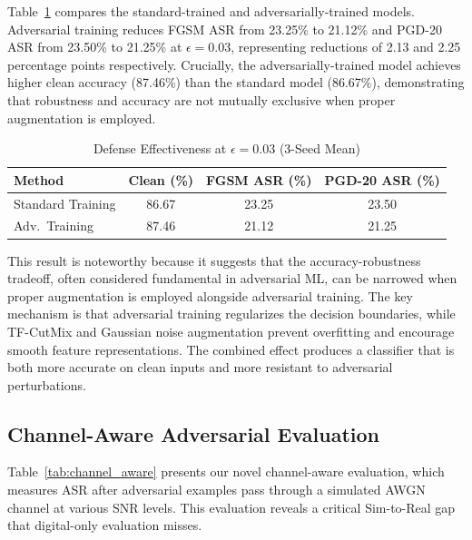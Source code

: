 \documentclass[conference]{IEEEtran}
\begin{document}
Table~\ref{tab:defense} compares the standard-trained and adversarially-trained models. Adversarial training reduces FGSM ASR from 23.25\% to 21.12\% and PGD-20 ASR from 23.50\% to 21.25\% at $\epsilon = 0.03$, representing reductions of 2.13 and 2.25 percentage points respectively. Crucially, the adversarially-trained model achieves higher clean accuracy (87.46\%) than the standard model (86.67\%), demonstrating that robustness and accuracy are not mutually exclusive when proper augmentation is employed.

\begin{table}[t]
\centering
\caption{Defense Effectiveness at $\epsilon=0.03$ (3-Seed Mean)}\label{tab:defense}
\begin{tabular}{lccc}
\toprule
\textbf{Method} & \textbf{Clean (\%)} & \textbf{FGSM ASR (\%)} & \textbf{PGD-20 ASR (\%)} \\
\midrule
Standard Training & 86.67 & 23.25 & 23.50 \\
Adv.\ Training & 87.46 & 21.12 & 21.25 \\
\bottomrule
\end{tabular}
\end{table}

This result is noteworthy because it suggests that the accuracy-robustness tradeoff, often considered fundamental in adversarial ML, can be narrowed when proper augmentation is employed alongside adversarial training. The key mechanism is that adversarial training regularizes the decision boundaries, while TF-CutMix and Gaussian noise augmentation prevent overfitting and encourage smooth feature representations. The combined effect produces a classifier that is both more accurate on clean inputs and more resistant to adversarial perturbations.

\subsection{Channel-Aware Adversarial Evaluation}

Table~\ref{tab:channel_aware} presents our novel channel-aware evaluation, which measures ASR after adversarial examples pass through a simulated AWGN channel at various SNR levels. This evaluation reveals a critical Sim-to-Real gap that digital-only evaluation misses.
\end{document}

